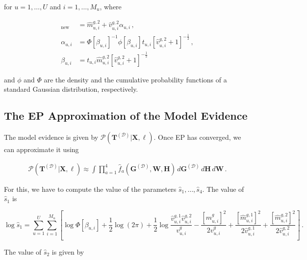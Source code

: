 \documentclass{article}
\begin{document}
for $u = 1,\ldots,U$ and $i = 1,\ldots,M_u$, where

\begin{align}
[m_{u,i}]_\text{new} & = \hat{m}_{u,i}^{g,2} + \hat{v}_{u,i}^{g,2} \alpha_{u,i}\,,\\
\alpha_{u,i} & = \Phi[\beta_{u,i}]^{-1} \phi[\beta_{u,i}] t_{u,i} [\hat{v}_{u,i}^{g,2} + 1]^{-\frac{1}{2}}\,,\\
\beta_{u,i} & = t_{u,i} \hat{m}_{u,i}^{g,2} [\hat{v}_{u,i}^{g,2} + 1]^{-\frac{1}{2}}
\end{align}

and $\phi$ and $\Phi$ are the density and the cumulative probability functions of a standard Gaussian distribution,
respectively.

\subsection{The EP Approximation of the Model Evidence}

The model evidence is given by $\mathcal{P}(\mathbf{T}^{(\mathcal{D})}|\mathbf{X},\ell)$. Once EP has converged, we can approximate it using

\begin{align}
\mathcal{P}(\mathbf{T}^{(\mathcal{D})}|\mathbf{X},\ell) \approx \int \prod_{a=1}^4
\hat{f}_a(\mathbf{G}^{(\mathcal{D})},\mathbf{W},\mathbf{H})\,d\mathbf{G}^{(\mathcal{D})}\,d\mathbf{H}\,d\mathbf{W}\,.
\end{align}

For this, we have to compute the value of the parameters $\hat{s}_1,\ldots,\hat{s}_4$. The value of $\hat{s}_1$ is

\begin{equation}
\log\hat{s}_1 = \sum_{u=1}^{U}\sum_{i=1}^{M_u}\left[\log \Phi[\beta_{u,i}] +
\frac{1}{2}\log(2\pi)+\frac{1}{2}\log \frac{\hat{v}_{u,i}^{g,1} \hat{v}_{u,i}^{g,2}}{v_{u,i}^g}-
\frac{[m_{u,i}^g]^2}{2v_{u,i}^g}+\frac{[\hat{m}_{u,i}^{g,1}]^2}{2\hat{v}_{u,i}^{g,1}}+
\frac{[\hat{m}_{u,i}^{g,2}]^2}{2\hat{v}_{u,i}^{g,2}}\right]\,.
\end{equation}

The value of $\hat{s}_2$ is given by
\end{document}
